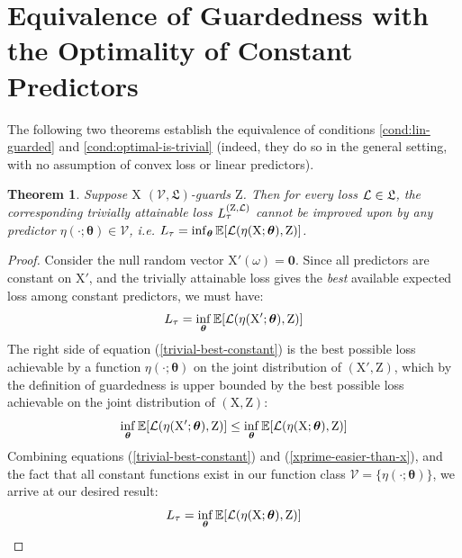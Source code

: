 \documentclass{article}
\theoremstyle{plain}
\newtheorem{theorem}{Theorem}[section]
\theoremstyle{remark}
\newcommand{\vtheta}{{ \boldsymbol \theta}}
\newcommand{\E}{\mathbb E}
\newcommand{\Ltriv}{L_\tau}
\newcommand{\Ltrivfull}{L_\tau^{(\rv Z, \loss)}}
\theoremstyle{plain}
\theoremstyle{TheoremNum}
\newcommand{\rv}[1]{{\mathrm{#1}}}
\newcommand{\loss}{\color{black} \mathcal{L}}
\begin{document}
\section{Equivalence of Guardedness with the Optimality of Constant Predictors}\label{sec:eqv-guardedness-with-optimality-of-constant-predictors}

The following two theorems establish the equivalence of conditions \ref{cond:lin-guarded} and \ref{cond:optimal-is-trivial} (indeed, they do so in the general setting, with no assumption of convex loss or linear predictors).

\begin{theorem}\label{thm:guarded-to-trivial}
    Suppose $\rv X$ $(\mathcal V, \mathfrak L)$-guards $\rv Z$. Then for every loss $\loss \in \mathfrak L$, the corresponding trivially attainable loss $\Ltrivfull$ cannot be improved upon by any predictor $\eta(\cdot; \vtheta) \in \mathcal V$, i.e. $\Ltriv = \inf_\vtheta \E[\loss(\eta(\rv X; \vtheta), \rv Z)]$.
\end{theorem}

\begin{proof}
    \label{app:guarded-to-trivial}
    Consider the null random vector $\rv X'(\omega) = \mathbf 0$. Since all predictors are constant on $\rv X'$, and the trivially attainable loss gives the \textit{best} available expected loss among constant predictors, we must have:
    \begin{equation}\label{trivial-best-constant}
        \Ltriv = \inf_\vtheta \E[\loss(\eta(\rv X'; \vtheta), \rv Z)]
    \end{equation}
    The right side of equation (\ref{trivial-best-constant}) is the best possible loss achievable by a function $\eta(\cdot; \vtheta)$ on the joint distribution of $(\rv X', \rv Z)$, which by the definition of guardedness is upper bounded by the best possible loss achievable on the joint distribution of $(\rv X, \rv Z)$:
    \begin{equation}\label{xprime-easier-than-x}
        \inf_\vtheta \E[\loss(\eta(\rv X'; \vtheta), \rv Z)]
        \le \inf_\vtheta \E[\loss(\eta(\rv X; \vtheta), \rv Z)]
    \end{equation}
    Combining equations (\ref{trivial-best-constant}) and (\ref{xprime-easier-than-x}), and the fact that all constant functions exist in our function class $\mathcal V = \{\eta(\cdot; \vtheta)\}$, we arrive at our desired result:
    \begin{equation*}
        \Ltriv = \inf_\vtheta \E[\loss(\eta(\rv X; \vtheta), \rv Z)]
    \end{equation*}
\end{proof}
\end{document}
